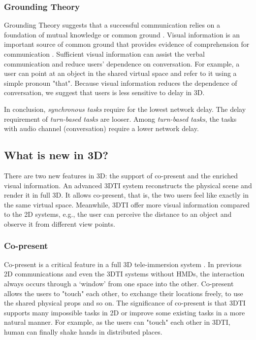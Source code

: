 \subsubsection{Grounding Theory}

Grounding Theory suggests that a successful communication relies on a foundation of mutual knowledge or common ground \cite{clark1981definite, clark1990referring}. Visual information is an important source of common ground that provides evidence of comprehension for communication \cite{brennan2005conversation, kraut2003visual}. Sufficient visual information can assist the verbal communication \cite{gergle2006impact} and reduce users' dependence on conversation. For example, a user can point at an object in the shared virtual space and refer to it using a simple pronoun "that". Because visual information reduces the dependence of conversation, we suggest that users is less sensitive to delay in 3D.

\vspace{0.2cm}

In conclusion, \emph{synchronous tasks} require for the lowest network delay. The delay requirement of \emph{turn-based tasks} are looser. Among \emph{turn-based tasks}, the tasks with audio channel (conversation) require a lower network delay.

\subsection{What is new in 3D?}

There are two new features in 3D: the support of co-present and the enriched visual information. An advanced 3DTI system reconstructs the physical scene and render it in full 3D. It allows co-present, that is, the two users feel like exactly in the same virtual space. Meanwhile, 3DTI offer more visual information compared to the 2D systems, e.g., the user can perceive the distance to an object and observe it from different view points.

\subsubsection{Co-present}

Co-present is a critical feature in a full 3D tele-immersion system \cite{orts2016holoportation, whittaker2003things, kraut2003visual}. In previous 2D communications and even the 3DTI systems without HMDs, the interaction always occurs through a ‘window’ from one space into the other. Co-present allows the users to "touch" each other, to exchange their locations freely, to use the shared physical props \cite{luff1998mobility} and so on. The significance of co-present is that 3DTI supports many impossible tasks in 2D or improve some existing tasks in a more natural manner. For example, as the users can "touch" each other in 3DTI, human can finally shake hands in distributed places.

